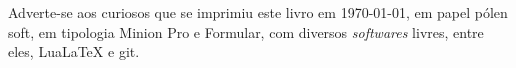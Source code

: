 \pagebreak

\ifodd\value{page}\blankpage\fi

\mbox{}\vfill


\begin{center}
		\begin{minipage}{.7\textwidth}\tiny\noindent{}
		\centering\tiny
		Adverte-se aos curiosos que se imprimiu este 
		livro
		em \today{}, em papel pólen soft, em tipologia Minion Pro e Formular, 
		com diversos \emph{softwares} livres, 
		entre eles, Lua\LaTeX{} e git.\\
		\par\medskip
		\end{minipage}
\end{center}